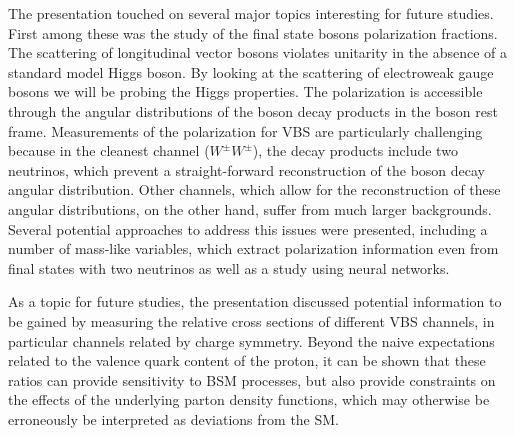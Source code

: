 The presentation touched on several major topics interesting for future studies. First among these was the study of the final state bosons polarization fractions. The scattering of longitudinal vector bosons violates unitarity in the absence of a standard model Higgs boson. By looking at the scattering of electroweak gauge bosons we will be probing the Higgs properties. %
The polarization is accessible through the angular distributions of the boson decay products in the boson rest frame. 
Measurements of the polarization for VBS are particularly challenging because in the cleanest channel ($W^\pm W^\pm$), the decay products include two neutrinos, which prevent a straight-forward reconstruction of the boson decay angular distribution. Other channels, which allow for the reconstruction of these angular distributions, on the other hand, suffer from much larger backgrounds. Several potential approaches to address this issues were presented, including a number of mass-like variables, which extract polarization information even from final states with two neutrinos as well as a study using neural networks. 


As a topic for future studies, the presentation discussed potential information to be gained by measuring the relative cross sections of different VBS channels, in particular channels related by charge symmetry. Beyond the naive expectations related to the valence quark content of the proton, it can be shown that these ratios can provide sensitivity to BSM processes, but also provide constraints on the effects of the underlying parton density functions, which may otherwise be erroneously be interpreted as deviations from the SM.


